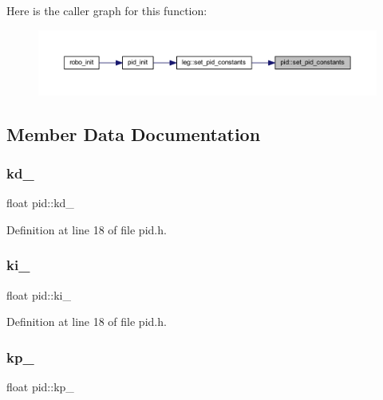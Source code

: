 Here is the caller graph for this function\+:
\nopagebreak
\begin{figure}[H]
\begin{center}
\leavevmode
\includegraphics[width=350pt]{classpid_a345ce01f84470d635660b342770dce7c_icgraph}
\end{center}
\end{figure}


\subsection{Member Data Documentation}
\mbox{\label{classpid_a93f4eff0b2d9700c609af887553e0d6a}} 
\subsubsection{\texorpdfstring{kd\_}{kd\_}}
{\footnotesize\ttfamily float pid\+::kd\+\_\hspace{0.3cm}{\ttfamily [private]}}



Definition at line 18 of file pid.\+h.

\mbox{\label{classpid_ae9f9e01cc473eb37061384afdc313249}} 
\subsubsection{\texorpdfstring{ki\_}{ki\_}}
{\footnotesize\ttfamily float pid\+::ki\+\_\hspace{0.3cm}{\ttfamily [private]}}



Definition at line 18 of file pid.\+h.

\mbox{\label{classpid_a3d8bf85356ae8164ce6cf67cd012a637}} 
\subsubsection{\texorpdfstring{kp\_}{kp\_}}
{\footnotesize\ttfamily float pid\+::kp\+\_\hspace{0.3cm}{\ttfamily [private]}}



